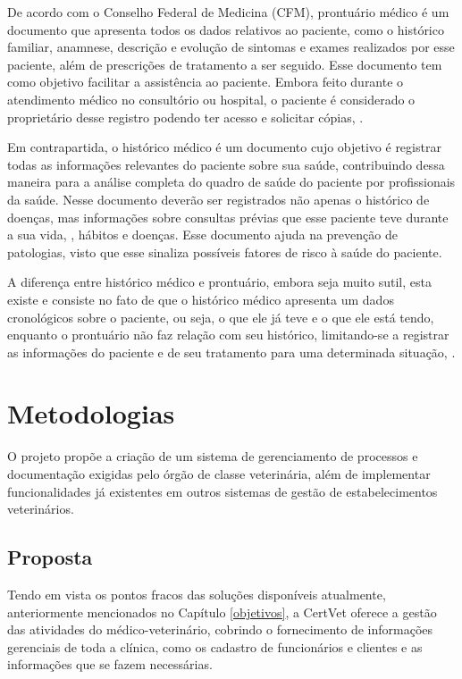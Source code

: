 \documentclass[
    12pt,               %
    openright,          %
    oneside,
    a4paper,            %
    BIBLATEX,           %
    TODO,               %
    english,            %
    brazil              %
    ]{ifsp-spo-inf-ctds}
\begin{document}
    De acordo com o Conselho Federal de Medicina (CFM), prontuário médico é um documento que apresenta todos os dados relativos ao paciente, como o histórico familiar, anamnese, descrição e evolução de sintomas e exames realizados por esse paciente, além de prescrições de tratamento a ser seguido. Esse documento tem como objetivo facilitar a assistência ao paciente. Embora feito durante o atendimento médico no consultório ou hospital, o paciente é considerado o proprietário desse registro podendo ter acesso e solicitar cópias, .


    Em contrapartida, o histórico médico é um documento cujo objetivo é registrar todas as informações relevantes do paciente sobre sua saúde, contribuindo dessa maneira para a análise completa do quadro de saúde do paciente por profissionais da saúde. Nesse documento deverão ser registrados não apenas o histórico de doenças, mas informações sobre consultas prévias que esse paciente teve durante a sua vida, , hábitos e doenças. Esse documento ajuda na prevenção de patologias, visto que esse sinaliza possíveis fatores de risco à saúde do paciente. %

    A diferença entre histórico médico e prontuário, embora seja muito sutil, esta existe e consiste no fato de que o histórico médico apresenta um dados cronológicos sobre o paciente, ou seja, o que ele já teve e o que ele está tendo, enquanto o prontuário não faz relação com seu histórico, limitando-se a registrar as informações do paciente e de seu tratamento para uma determinada situação, . 

\chapter[Metodologias]{Metodologias}

    O projeto propõe a criação de um sistema de gerenciamento de processos e documentação exigidas pelo órgão de classe veterinária, além de implementar funcionalidades já existentes em outros sistemas de gestão de estabelecimentos veterinários. 

    \section{Proposta}
    
        Tendo em vista os pontos fracos das soluções disponíveis atualmente, anteriormente mencionados no Capítulo \ref{objetivos}, a CertVet oferece a gestão das atividades do médico-veterinário, cobrindo o fornecimento de informações gerenciais de toda a clínica, como os cadastro de funcionários e clientes e as informações que se fazem necessárias. 
        
\end{document}
